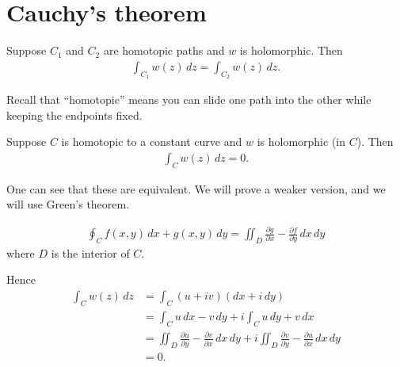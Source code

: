 \documentclass[11pt, oneside,margin=1in]{article}
\begin{document}
\section{Cauchy's theorem}
\begin{theorem}[Cauchy]\label{}\text{}
Suppose $C_1$ and $C_2$ are homotopic paths and $w$ is holomorphic. Then
\begin{align*}
	\int_{C_1}^{} w(z)  \, dz = \int_{C_2}^{} w(z)  \, dz.  
\end{align*}
\end{theorem}

Recall that ``homotopic'' means you can slide one path into the other while keeping the endpoints fixed. 
\begin{theorem}[Cauchy]\label{}\text{}
Suppose $C$ is homotopic to a constant curve and $w$ is holomorphic (in $C$). Then
\begin{align*}
	\int_{C}^{} w(z)  \, dz = 0. 
\end{align*}
\end{theorem}

One can see that these are equivalent. We will prove a weaker version, and we will use Green's theorem. 
\begin{theorem}[Green]\label{}\index{}\text{}
\begin{align*}
	\oint_C f(x,y)\,dx +  g (x,y) \, dy = \iint_D \frac{\partial g}{\partial x} - \frac{\partial f}{\partial y} \, dx\, dy
\end{align*}
where $D$ is the interior of $C$.
\end{theorem}

Hence 
\begin{align*}
	\int_{C}^{} w(z)  \, dz &=\int_{C}^{} (u+iv) (dx+i\,dy) \\
				&= \int_{C}^{} u\,dx - v  \, dy + i \int_{C}^{} u\, dy + v  \, dx\\
				&= \iint_D \frac{\partial u}{\partial y} - \frac{\partial v}{\partial x}\,dx\,dy + i \iint_D \frac{\partial v}{\partial y} - \frac{\partial u}{\partial x}\,dx\,dy\\
				&= 0.
\end{align*}
\end{document}
